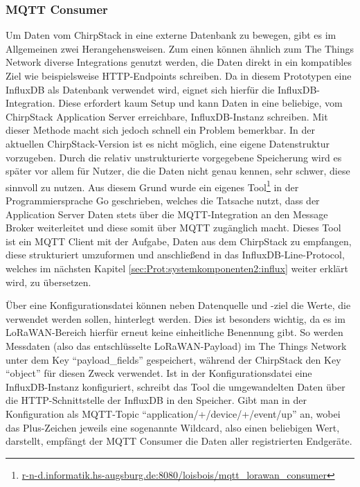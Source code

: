 \subsubsection{MQTT Consumer} %
\label{sec:Prot:systemkomponenten2:mqttcons}
Um Daten vom ChirpStack in eine externe Datenbank zu bewegen, gibt es im Allgemeinen zwei Herangehensweisen. Zum einen können ähnlich zum The Things Network diverse Integrations genutzt werden, die Daten direkt in ein kompatibles Ziel wie beispielsweise HTTP-Endpoints schreiben. Da in diesem Prototypen eine InfluxDB als Datenbank verwendet wird, eignet sich hierfür die InfluxDB-Integration. Diese erfordert kaum Setup und kann Daten in eine beliebige, vom ChirpStack Application Server erreichbare, InfluxDB-Instanz schreiben. Mit dieser Methode macht sich jedoch schnell ein Problem bemerkbar. In der aktuellen ChirpStack-Version ist es nicht möglich, eine eigene Datenstruktur vorzugeben. Durch die relativ unstrukturierte vorgegebene Speicherung wird es später vor allem für Nutzer, die die Daten nicht genau kennen, sehr schwer, diese sinnvoll zu nutzen. Aus diesem Grund wurde ein eigenes Tool\footnote{\url{r-n-d.informatik.hs-augsburg.de:8080/loisbois/mqtt\_lorawan\_consumer}} in der Programmiersprache Go geschrieben, welches die Tatsache nutzt, dass der Application Server Daten stets über die MQTT-Integration an den Message Broker weiterleitet und diese somit über MQTT zugänglich macht. Dieses Tool ist ein MQTT Client mit der Aufgabe, Daten aus dem ChirpStack zu empfangen, diese strukturiert umzuformen und anschließend in das InfluxDB-Line-Protocol, welches im nächsten Kapitel \ref{sec:Prot:systemkomponenten2:influx} weiter erklärt wird, zu übersetzen. 

Über eine Konfigurationsdatei können neben Datenquelle und -ziel die Werte, die verwendet werden sollen, hinterlegt werden. Dies ist besonders wichtig, da es im LoRaWAN-Bereich hierfür erneut keine einheitliche Benennung gibt. So werden Messdaten (also das entschlüsselte LoRaWAN-Payload) im The Things Network unter dem Key ``payload\_fields'' gespeichert, während der ChirpStack den Key ``object'' für diesen Zweck verwendet. Ist in der Konfigurationsdatei eine InfluxDB-Instanz konfiguriert, schreibt das Tool die umgewandelten Daten über die HTTP-Schnittstelle der InfluxDB in den Speicher. Gibt man in der Konfiguration als MQTT-Topic ``application/+/device/+/event/up'' an, wobei das Plus-Zeichen jeweils eine sogenannte Wildcard, also einen beliebigen Wert, darstellt, empfängt der MQTT Consumer die Daten aller registrierten Endgeräte.

